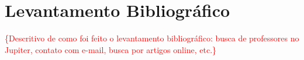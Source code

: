\chapter{Levantamento Bibliográfico}

\textcolor{red}{\{Descritivo de como foi feito o levantamento bibliográfico: busca de professores no Jupiter, contato com e-mail, busca por artigos online, etc.\}}

